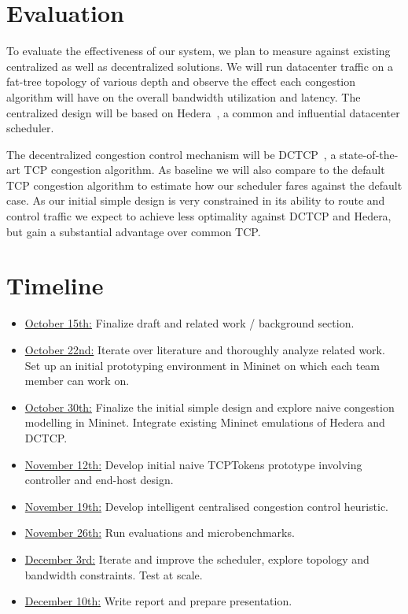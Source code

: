 \documentclass[sigconf]{acmart}
\begin{document}
\section{Evaluation}
\label{sec:evaluation}
To evaluate the effectiveness of our system, we plan to measure against existing centralized as well as decentralized solutions. We will run datacenter traffic on a fat-tree topology of various depth and observe the effect each congestion algorithm will have on the overall bandwidth utilization and latency.
The centralized design will be based on Hedera~\cite{hedera}, a common and influential datacenter scheduler.

The decentralized congestion control mechanism will be DCTCP~\cite{dctcp}, a state-of-the-art TCP congestion algorithm. As baseline we will also compare to the default TCP congestion algorithm to estimate how our scheduler fares against the default case. As our initial simple design is very constrained in its ability to route and control traffic we expect to achieve less optimality against DCTCP and Hedera, but gain a substantial advantage over common TCP.

\section{Timeline}
\label{sec:timeline}
\begin{itemize}
\item \underline{October 15th:} Finalize draft and related work / background section.
\item \underline{ October 22nd:} Iterate over literature and thoroughly analyze related work. Set up an initial prototyping environment in Mininet on which each team member can work on.
\item \underline{October 30th:} Finalize the initial simple design and explore naive congestion modelling in Mininet. Integrate existing Mininet emulations of Hedera and DCTCP.
\item \underline{November 12th:} Develop initial naive TCPTokens prototype involving controller and end-host design.
\item \underline{November 19th:} Develop intelligent centralised congestion control heuristic.
\item \underline{November 26th:} Run evaluations and microbenchmarks.
\item \underline{December 3rd:} Iterate and improve the scheduler, explore topology and bandwidth constraints. Test at scale.
\item \underline{December 10th:} Write report and prepare presentation.
\end{itemize}




 
\end{document}

